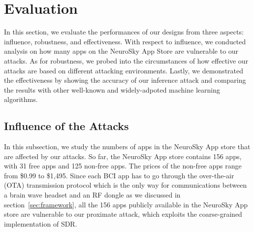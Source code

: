 \section{Evaluation}
\label{sec:performance}

In this section, we evaluate the performances of our designs from three aspects: influence, robustness, and effectiveness. With respect to influence, we conducted analysis on how many apps on the NeuroSky App Store are vulnerable to our attacks. As for robustness, we probed into the circumstances of how effective our attacks are based on different attacking environments. Lastly, we demonstrated the effectiveness by showing the accuracy of our inference attack and comparing the results with other well-known and widely-adpoted machine learning algorithms.

\subsection{Influence of the Attacks}
In this subsection, we study the numbers of apps in the NeuroSky App store that are affected by our attacks. So far, the NeuroSky App store contains 156 apps, with 31 free apps and 125 non-free apps. The prices of the non-free apps range from \$0.99 to \$1,495. Since each BCI app has to go through the over-the-air (OTA) transmission protocol which is the only way for communications between a brain wave headset and an RF dongle as we discussed in section~\ref{sec:framework}, all the 156 apps publicly available in the NeuroSky App store are vulnerable to our proximate attack, which exploits the coarse-grained implementation of SDR.\\
%
